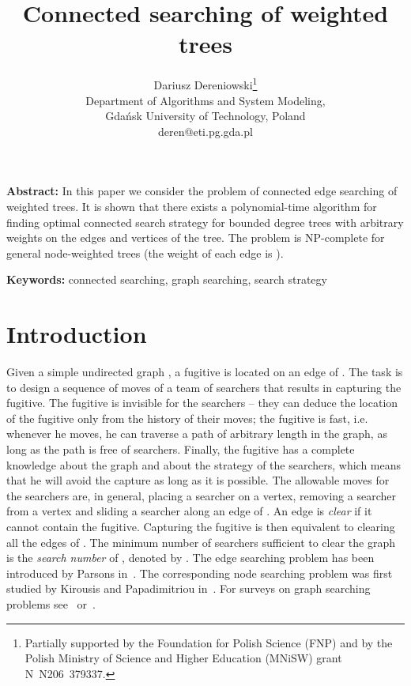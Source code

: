 \documentclass[10pt]{article}
\begin{document}
\title{Connected searching of weighted trees}

\author{Dariusz Dereniowski\thanks{Partially supported by the Foundation for Polish Science (FNP) and by the Polish Ministry of Science and Higher Education (MNiSW) grant N~N206~379337.}\\
       Department of Algorithms and System Modeling,\\
       Gda\'{n}sk University of Technology, Poland\\
       \small{deren@eti.pg.gda.pl}}

\maketitle


\begin{center}
\parbox[c]{10 cm}{
\textbf{Abstract:} In this paper we consider the problem of connected edge searching of weighted trees. It is shown that there exists a polynomial-time algorithm for finding optimal connected search strategy for bounded degree trees with arbitrary weights on the edges and vertices of the tree. The problem is NP-complete for general node-weighted trees (the weight of each edge is ).
}
\end{center}

\vspace{5 pt}


\textbf{Keywords:} connected searching, graph searching, search strategy

\section{Introduction}
\label{sec:intro}

Given a simple undirected graph , a fugitive is located on an edge of . The task is to design a sequence of moves of a team of searchers that results in capturing the fugitive. The fugitive is invisible for the searchers -- they can deduce the location of the fugitive only from the history of their moves; the fugitive is fast, i.e. whenever he moves, he can traverse a path of arbitrary length in the graph, as long as the path is free of searchers. Finally, the fugitive has a complete knowledge about the graph and about the strategy of the searchers, which means that he will avoid the capture as long as it is possible. The allowable moves for the searchers are, in general, placing a searcher on a vertex, removing a searcher from a vertex and sliding a searcher along an edge of . An edge is \emph{clear} if it cannot contain the fugitive. Capturing the fugitive is then equivalent to clearing all the edges of . The minimum number of searchers sufficient to clear the graph is the \emph{search number} of , denoted by . The edge searching problem has been introduced by Parsons in~\cite{Parsons76}. The corresponding node searching problem was first studied by Kirousis and Papadimitriou in~\cite{searching_and_pebbling}. For surveys on graph searching problems see~\cite{guaranteed_graph_searching} or~\cite{searchng_and_sweeping}.
\end{document}
